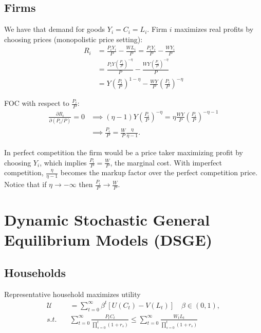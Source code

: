 \documentclass{article}
\newcommand{\?}{\textcolor{red}{(?)}} %
\begin{document}
    \subsection{Firms}
    
        We have that demand for goods $Y_i = C_i = L_i$. Firm $i$ maximizes real profits by choosing prices (monopolistic price setting):
        \begin{align}
            R_i &= \frac{P_i Y_i}{P} - \frac{W L_i}{P}
            = \frac{P_i Y_i}{P} - \frac{W Y_i}{P}
            \\
            &= \frac{P_i Y \left(\frac{P_i}{P}\right)^{-\eta}}{P} - \frac{W Y \left(\frac{P_i}{P}\right)^{-\eta}}{P}
            \\
            &= Y \left(\frac{{P_i}}{P}\right)^{1-\eta} - \frac{WY}{P} \left(\frac{{P_i}}{P}\right)^{-\eta}
        \end{align}
        
        FOC with respect to $\frac{P_i}{P}$:
        \begin{align}
            \frac{\partial R_i}{\partial (P_i / P)} = 0
            &\implies 
            (\eta-1) Y \left(\frac{{P_i}}{P}\right)^{-\eta} 
            = \eta \frac{WY}{P} \left(\frac{{P_i}}{P}\right)^{-\eta-1}
            \\
            &\implies
            \frac{P_i}{P} = \frac{W}{P} \frac{\eta}{\eta-1}.
            \label{eqn:markup-price}
        \end{align}
        
        In perfect competition the firm would be a price taker maximizing profit by choosing $Y_i$, which implies $\frac{P_i}{P} = \frac{W}{P}$, the marginal cost. With imperfect competition, $\frac{\eta}{\eta - 1}$ becomes the markup factor over the perfect competition price. Notice that if $\eta \to -\infty$ then $\frac{P_i}{P} \to \frac{W}{P}$.
        
    
    
    \section{Dynamic Stochastic General Equilibrium Models (DSGE)}
        
    \subsection{Households}
        Representative household maximizes utility
        \begin{align}
            \mathcal{U} &= \sum_{t=0}^{\infty} \beta^{t} [U(C_t) - V(L_t)]
            \quad \beta \in (0, 1),
            \\
            s.t. \quad &
            \sum_{t=0}^{\infty} \frac{P_t C_t}{\prod_{s=0}^{t}(1+r_{s})} \le
            \sum_{t=0}^{\infty} \frac{W_t L_t}{\prod_{s=0}^{t}(1+r_{s})}
        \end{align}
        
\end{document}
